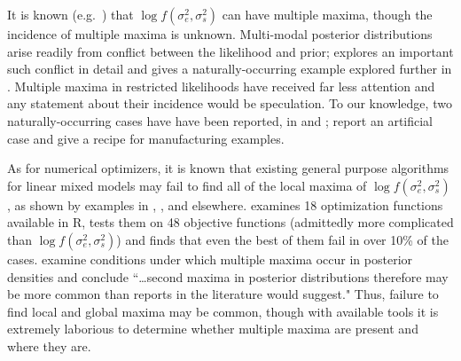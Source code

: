\documentclass{report}
\newcommand{\textcompute}{\textsf}
\newcommand{\R}{\textcompute{R}\xspace}
\newcommand{\RL}{f}
\newcommand{\logRL}{\log\RL}
\newcommand{\sigssq}{\sigma_s^2}
\newcommand{\sigesq}{\sigma_e^2}
\newcommand{\logRLss}{\logRL(\sigesq,\sigssq)}
\begin{document}
It is known (e.g.\ \citealt{henn&hodges:2014}) that $\logRLss$
can have multiple maxima,
though the incidence of multiple maxima is unknown.  Multi-modal posterior distributions arise readily from conflict between the likelihood and prior;  \cite{Liu&Hodges:2003} explores an important such conflict in detail and \cite{wakefield:1998} gives a naturally-occurring example explored further in \cite{henn&hodges:2014}.  Multiple maxima in restricted likelihoods have received far less attention and any statement about their incidence would be speculation.  To our knowledge, two naturally-occurring cases have have been reported, in \cite{welham_thompson:2009} and \cite{reiss_etal:2014};  \cite{henn&hodges:2014} report an artificial case and give a recipe for manufacturing examples.  

As for numerical optimizers, it is known that existing general purpose algorithms for linear mixed models may fail to find all of the local maxima of $\logRLss$, as shown by examples in \cite{hodges:2013}, \cite{henn&hodges:2014}, and elsewhere.  \cite{mullen:2014} examines 18 optimization functions available in \R, tests them on 48 objective functions (admittedly more complicated than $\logRLss$) and finds that even the best of them fail in over 10\% of the cases.  \cite{henn&hodges:2014} examine conditions under which multiple maxima occur in posterior densities and conclude ``\dots second maxima in posterior distributions therefore may be more common than reports in the literature would suggest."  Thus, failure to find local and global maxima may be common, though with available tools it is extremely laborious to determine whether multiple maxima are present and where they are.
\end{document}

